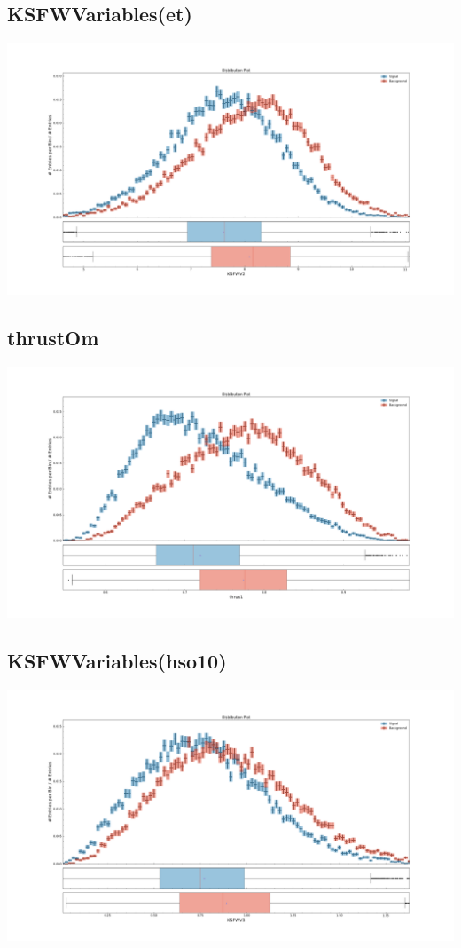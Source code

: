 \documentclass[10pt,a4paper]{article}
\begin{document}
\subsection{KSFWVariables(et)}
\begin{center}
\includegraphics[width=1.0\textwidth]{variable_6591597707886277308.pdf}
\end{center}
\subsection{thrustOm}
\begin{center}
\includegraphics[width=1.0\textwidth]{variable_-6331307684765765574.pdf}
\end{center}
\subsection{KSFWVariables(hso10)}
\begin{center}
\includegraphics[width=1.0\textwidth]{variable_812901760584507277.pdf}
\end{center}
\end{document}
